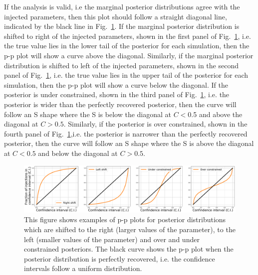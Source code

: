 If the analysis is valid, i.e the marginal posterior distributions agree with the injected parameters, then this plot should follow a straight diagonal line, indicated by the black line in Fig.~\ref{par_est:results:ppplot_example}.
If the marginal posterior distribution is shifted to right of the injected parameters, shown in the first panel of Fig.~\ref{par_est:results:ppplot_example}, i.e. the true value lies in the lower tail of the posterior for each simulation, then the p-p plot will show a curve above the diagonal.
Similarly, if the marginal posterior distribution is shifted to left of the injected parameters, shown in the second panel of Fig.~\ref{par_est:results:ppplot_example}, i.e. the true value lies in the upper tail of the posterior for each simulation, then the p-p plot will show a curve below the diagonal. 
If the posterior is under constrained, shown in the third panel of Fig.~\ref{par_est:results:ppplot_example}, i.e. the posterior is wider than the perfectly recovered posterior, then the curve will follow an S shape where the S is below the diagonal at $C < 0$.5 and above the diagonal at $C > 0.5$.
Similarly, if the posterior is over constrained, shown in the fourth panel of Fig.~\ref{par_est:results:ppplot_example},i.e. the posterior is narrower than the perfectly recovered posterior, then the curve will follow an S shape where the S is above the diagonal at $C < 0.5$ and below the diagonal at $C> 0.5$.
%
\begin{figure}[ht]
    \centering
    \includegraphics[width=\linewidth]{C5_parameter/ppplot_examples.pdf}
    \caption[p-p plot examples]{This figure shows examples of p-p plots for posterior distributions which are shifted to the right (larger values of the parameter), to the left (smaller values of the parameter) and over and under constrained posteriors. The black curve shows the p-p plot when the posterior distribution is perfectly recovered, i.e. the confidence intervals follow a uniform distribution.}
    \label{par_est:results:ppplot_example}
\end{figure}

